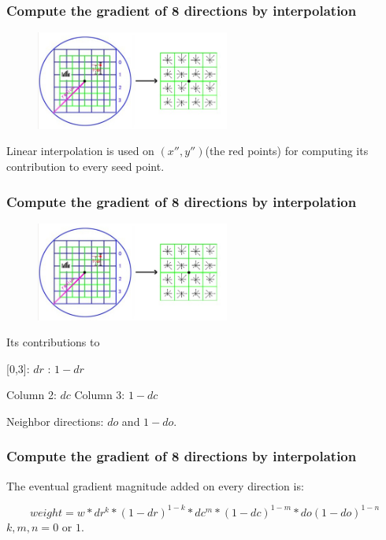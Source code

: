 \documentclass[notheorems, serif, table, compress]{beamer}  %
\begin{document}
\begin{frame}[fragile]
\frametitle{Compute the gradient of 8 directions by interpolation}%
\begin{figure}
  \centering\includegraphics[width=2.5in]{miaoshuzi.png}
  \caption{}
 \label{miaoshuzi}
  \end{figure}

Linear interpolation is used on $(x'',y'')$(the red points) for computing its contribution to every seed point.  

\end{frame}

\begin{frame}[fragile]
\frametitle{Compute the gradient of 8 directions by interpolation}
\begin{figure}
  \centering\includegraphics[width=2.5in]{miaoshuzi.png}
  \caption{}
 \label{miaoshuzi}
  \end{figure}
\begin{description}
\item[Its contributions to]
\end{description}

[0,3]: $dr$ \qquad [1,3]:  $1-dr$

Column 2: $dc$ \qquad Column 3: $1-dc$

Neighbor directions: $do$ and $1-do$. 
\end{frame}

\begin{frame}[fragile]
\frametitle{Compute the gradient of 8 directions by interpolation}
The eventual gradient magnitude added on every direction is:

\begin{equation}
weight=w*dr^{k}*(1-dr)^{1-k}*dc^{m}*(1-dc)^{1-m}*do(1-do)^{1-n}
\end{equation}
$k,m,n=0$ or $1$.
\end{frame}
\end{document}
